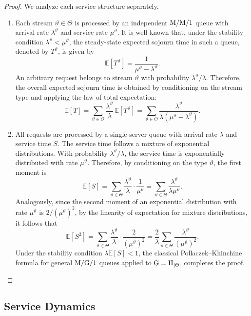\documentclass[a4paper,11pt,reqno]{amsart}
\begin{document}
\begin{proof}
We analyze each service structure separately.
\begin{enumerate}[label=\roman*)]
    \item 
Each stream $\vartheta \in \Theta$ is processed by an independent ${\rm M/M/1}$ queue with arrival rate $\lambda^\vartheta$ and service rate $\mu^\vartheta$. It is well known that, under the stability condition $\lambda^\vartheta < \mu^\vartheta$, the steady-state expected sojourn time in such a queue, denoted by $T^\vartheta$, is given by
$$
\mathbb{E}[T^\vartheta] = \frac{1}{\mu^\vartheta - \lambda^\vartheta}.
$$
An arbitrary request belongs to stream $\vartheta$ with probability $\lambda^\vartheta/\lambda$. Therefore, the overall expected sojourn time is obtained by conditioning on the stream type and applying the law of total expectation:
$$
\mathbb{E}[T]
= \sum_{\vartheta \in \Theta} \frac{\lambda^\vartheta}{\lambda} \,\mathbb{E}[T^\vartheta]
= \sum_{\vartheta \in \Theta} \frac{\lambda^\vartheta}{\lambda (\mu^\vartheta - \lambda^\vartheta)}.
$$

\item All requests are processed by a single-server queue with arrival rate $\lambda$ and service time $S$. The service time follows a mixture of exponential distributions. With probability $\lambda^\vartheta/\lambda$, the service time is exponentially distributed with rate $\mu^\vartheta$. Therefore, by conditioning on the type $\vartheta$, the first moment is
$$
\mathbb{E}[S]
= \sum_{\vartheta \in \Theta} \frac{\lambda^\vartheta}{\lambda} \cdot \frac{1}{\mu^\vartheta}
= \sum_{\vartheta \in\Theta} \frac{\lambda^\vartheta}{\lambda \mu^\vartheta}.
$$
Analogously, since the second moment of an exponential distribution with rate $\mu^\vartheta$ is $2/(\mu^\vartheta)^2$, by the linearity of expectation for mixture distributions, it follows that
$$
\mathbb{E}[S^2]
= \sum_{\vartheta \in \Theta} \frac{\lambda^\vartheta}{\lambda} \cdot \frac{2}{(\mu^\vartheta)^2}
= \frac{2}{\lambda} \sum_{\vartheta \in \Theta} \frac{\lambda^\vartheta}{(\mu^\vartheta)^2}.
$$
Under the stability condition $\lambda \mathbb{E}[S] < 1$, the classical Pollaczek--Khinchine formula for general ${\rm M/G/1}$ queues applied to $\rm G=\rm H_{|\Theta|}$ completes the proof.
\end{enumerate}
\end{proof}

\subsection{Service Dynamics}\label{sec:service_dynamics}
\end{document}
